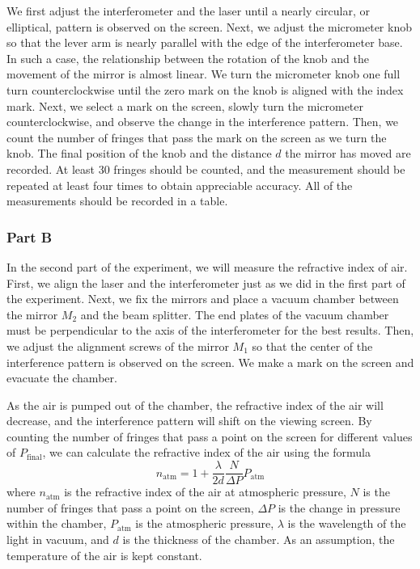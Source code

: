\documentclass[10pt]{article}
\begin{document}
We first adjust the interferometer and the laser until a nearly circular, or elliptical, pattern is observed on the screen. Next, we adjust the micrometer knob so that the lever arm is nearly parallel with the edge of the interferometer base. In such a case, the relationship between the rotation of the knob and the movement of the mirror is almost linear. We turn the micrometer knob one full turn counterclockwise until the zero mark on the knob is aligned with the index mark. Next, we select a mark on the screen, slowly turn the micrometer counterclockwise, and observe the change in the interference pattern. Then, we count the number of fringes that pass the mark on the screen as we turn the knob. The final position of the knob and the distance $d$ the mirror has moved are recorded. At least 30 fringes should be counted, and the measurement should be repeated at least four times to obtain appreciable accuracy. All of the measurements should be recorded in a table.

\subsubsection*{Part B}

In the second part of the experiment, we will measure the refractive index of air. First, we align the laser and the interferometer just as we did in the first part of the experiment. Next, we fix the mirrors and place a vacuum chamber between the mirror $M_2$ and the beam splitter. The end plates of the vacuum chamber must be perpendicular to the axis of the interferometer for the best results. Then, we adjust the alignment screws of the mirror $M_1$ so that the center of the interference pattern is observed on the screen. We make a mark on the screen and evacuate the chamber.

As the air is pumped out of the chamber, the refractive index of the air will decrease, and the interference pattern will shift on the viewing screen. By counting the number of fringes that pass a point on the screen for different values of $P_{\text{final}}$, we can calculate the refractive index of the air using the formula
\begin{equation}
  n_{\text{atm}} = 1 + \dfrac{\lambda}{2d} \dfrac{N}{\Delta P} P_{\text{atm}}
\end{equation}
where $n_{\text{atm}}$ is the refractive index of the air at atmospheric pressure, $N$ is the number of fringes that pass a point on the screen, $\Delta P$ is the change in pressure within the chamber, $P_{\text{atm}}$ is the atmospheric pressure, $\lambda$ is the wavelength of the light in vacuum, and $d$ is the thickness of the chamber. As an assumption, the temperature of the air is kept constant. 
\end{document}

